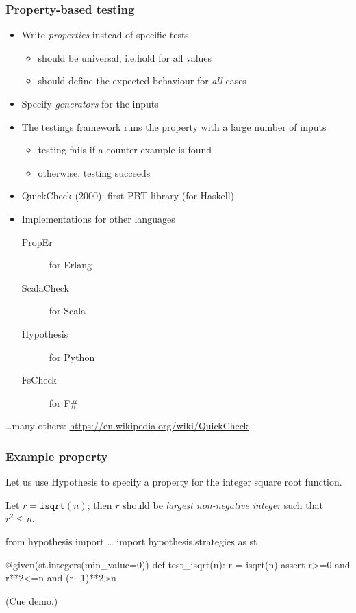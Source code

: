 \documentclass{beamer}
\begin{document}
\begin{frame}[allowframebreaks]
  \frametitle{Property-based testing}

\begin{itemize}
\item Write \emph{properties} instead of specific tests
\begin{itemize}
\item should be universal, i.e.\@ hold for all values
\item should define the expected behaviour for \emph{all} cases
\end{itemize}
\item Specify \emph{generators} for the inputs
\item The testings framework runs the property with
  a large number of inputs
  \begin{itemize}
  \item testing fails if a \alert{counter-example} is found
  \item otherwise, testing succeeds
  \end{itemize}
\end{itemize}

\framebreak

\begin{itemize}
\item QuickCheck (2000): first PBT library (for Haskell)
\item Implementations for other languages
  \begin{description}
    \item[PropEr] for Erlang
  \item[ScalaCheck] for Scala
  \item[Hypothesis] for Python
  \item[FsCheck] for F\#
  \end{description}
\end{itemize}

\ldots many others: \url{https://en.wikipedia.org/wiki/QuickCheck}
\end{frame}

\begin{frame}[fragile]
  \frametitle{Example property}

  Let us use Hypothesis to
  specify a property for the integer square root function.
  \pause
  \bigskip
  
  Let $r = \texttt{isqrt}(n)$; then
  $r$ should be \emph{largest non-negative integer} such that
  $r^2 \leq n$.
  \pause
  \bigskip
  
\begin{semiverbatim}
from hypothesis import \ldots
import hypothesis.strategies as st

@given(st.integers(min_value=0))
def test_isqrt(n):
    r = isqrt(n)
    assert r>=0 and r**2<=n and (r+1)**2>n
  \end{semiverbatim}

  \hfill (Cue demo.)
\end{frame}
\end{document}
